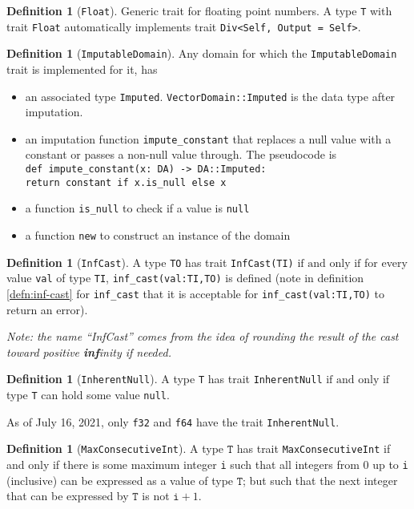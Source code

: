 \documentclass[11pt,a4paper]{article}
\theoremstyle{definition}
\newtheorem{definition}[theorem]{Definition}
\newcommand{\T}{\texttt{T}}
\newcommand{\iffText}{\text{if and only if}}
\begin{document}
\begin{definition}[\texttt{Float}]
    Generic trait for floating point numbers. A type \texttt{T} with trait \texttt{Float} automatically implements trait \texttt{Div<Self, Output = Self>}.
\end{definition}

\begin{definition}[\texttt{ImputableDomain}] 
Any domain for which the \texttt{ImputableDomain} trait is implemented for it, has 
\begin{itemize}
    \item an associated type \texttt{Imputed}. \texttt{VectorDomain::Imputed} is the data type after imputation. 
    \item an imputation function \texttt{impute\_constant} that replaces a null value with a constant or passes a non-null value through. The pseudocode is \\
    \texttt{def impute\_constant(x: DA) -> DA::Imputed: \\ return constant if x.is\_null else x}
    \item  a function \texttt{is\_null} to check if a value is \texttt{null}
    \item a function \texttt{new} to construct an instance of the domain
\end{itemize}

\end{definition}

\begin{definition}[\texttt{InfCast}]
A type \texttt{TO} has trait \texttt{InfCast(TI)} $\iffText$ for every value \texttt{val} of type \texttt{TI}, \texttt{inf\_cast(val:TI,TO)} is defined (note in definition \ref{defn:inf-cast} for \texttt{inf\_cast} that it is acceptable for \texttt{inf\_cast(val:TI,TO)} to return an error).

\emph{Note: the name ``InfCast'' comes from the idea of rounding the result of the cast toward positive \textbf{inf}inity if needed.}
\end{definition}

\begin{definition}[\texttt{InherentNull}]
A type \texttt{T} has trait \texttt{InherentNull} $\iffText$ type \texttt{T} can hold some value \texttt{null}.

As of July 16, 2021, only \texttt{f32} and \texttt{f64} have the trait \texttt{InherentNull}.
\end{definition}


\begin{definition}[\texttt{MaxConsecutiveInt}]
A type $\T$ has trait \texttt{MaxConsecutiveInt} if and only if there is some maximum integer \texttt{i} such that all integers from 0 up to \texttt{i} (inclusive) can be expressed as a value of type $\T$; but such that the next integer that can be expressed by $\T$ is not $\texttt{i}+1$.
\end{definition}
\end{document}
